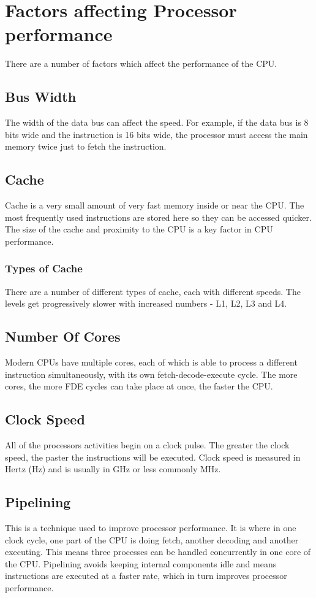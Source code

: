 \documentclass[a4paper,11pt, twocolumn]{article}
\begin{document}
\section{Factors affecting Processor performance}
There are a number of factors which affect the performance of the CPU.
\subsection{Bus Width}
The width of the data bus can affect the speed. For example, if the data bus is 8 bits wide and the instruction is 16 bits wide, the processor must access the main memory twice just to fetch the instruction. 
\subsection{Cache}
Cache is a very small amount of very fast memory inside or near the CPU. The most frequently used instructions are stored here so they can be accessed quicker. The size of the cache and proximity to the CPU is a key factor in CPU performance.
\subsubsection{Types of Cache}
There are a number of different types of cache, each with different speeds. The levels get progressively slower with increased numbers - L1, L2, L3 and L4. 
\subsection{Number Of Cores}
Modern CPUs have multiple cores, each of which is able to process a different instruction simultaneously, with its own fetch-decode-execute cycle. The more cores, the more FDE cycles can take place at once, the faster the CPU.
\subsection{Clock Speed}
All of the processors activities begin on a clock pulse. The greater the clock speed, the paster the instructions will be executed. Clock speed is measured in Hertz (Hz) and is usually in GHz or less commonly MHz.
\subsection{Pipelining}
This is a technique used to improve processor performance. It is where in one clock cycle, one part of the CPU is doing fetch, another decoding and another executing. This means three processes can be handled concurrently in one core of the CPU. Pipelining avoids keeping internal components idle and means instructions are executed at a faster rate, which in turn improves processor performance. 
\end{document}

